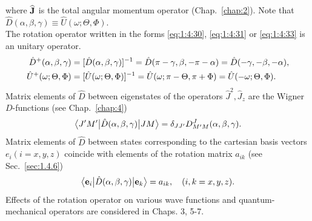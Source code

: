 where \(\widehat{\mathbf{J}}\) is the total angular momentum operator (Chap.~\ref{chap:2}). Note that \(\widehat{D}(\alpha, \beta, \gamma) \equiv \widehat{U}(\omega ; \Theta, \Phi)\).\\
The rotation operator written in the forms \eqref{eq:1:4:30}, \eqref{eq:1:4:31} or \eqref{eq:1:4:33} is an unitary operator.
\begin{align}
\hat{D}^{+}(\alpha, \beta, \gamma) & =[\hat{D}(\alpha, \beta, \gamma)]^{-1}=\hat{D}(\pi-\gamma, \beta,-\pi-\alpha)=\hat{D}(-\gamma,-\beta,-\alpha) , \notag\\
\hat{U}^{+}(\omega ; \Theta, \Phi) & =[\hat{U}(\omega ; \Theta, \Phi)]^{-1}=\hat{U}(\omega ; \pi-\Theta, \pi+\Phi)=\hat{U}(-\omega ; \Theta, \Phi) . \label{eq:1:4:34}
\end{align}
Matrix elements of \(\widehat{D}\) between eigenstates of the operators \(\widehat{J}^{2}, \widehat{J}_{z}\) are the Wigner \(D\)-functions (see Chap.~\ref{chap:4})
\begin{equation}
\bigl\langle J^{\prime} M^{\prime} \big| \hat{D}(\alpha, \beta, \gamma) \big| J M \bigr\rangle=\delta_{J J^{\prime}} D_{M^{\prime} M}^{J}(\alpha, \beta, \gamma) .\label{eq:1:4:35}
\end{equation}
Matrix elements of \(\widehat{D}\) between states corresponding to the cartesian basis vectors \(e_{i}(i=x, y, z)\) coincide with elements of the rotation matrix \(a_{i k}\) (see Sec.~\ref{sec:1.4.6})
\begin{equation}
\bigl\langle \mathbf{e}_{i} \big| \hat{D}(\alpha, \beta, \gamma) \big| \mathbf{e}_{k} \bigr\rangle=a_{i k}, \quad(i, k=x, y, z). \label{eq:1:4:36}
\end{equation}
Effects of the rotation operator on various wave functions and quantum-mechanical operators are considered in Chaps. 3, 5-7.

